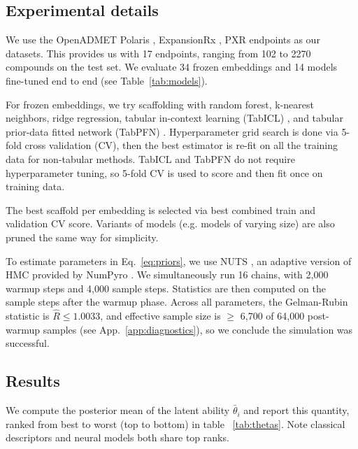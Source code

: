 \documentclass{article}
\begin{document}
\subsection{Experimental details}
We use the OpenADMET Polaris \citep{asap2025, polaris}, ExpansionRx \citep{expansionrx}, PXR \citep{pxr} endpoints as our datasets. This provides us with 17 endpoints, ranging from 102 to 2270 compounds on the test set. We evaluate 34 frozen embeddings and 14 models fine-tuned end to end (see Table~\ref{tab:models}).

For frozen embeddings, we try scaffolding with random forest, k-nearest neighbors, ridge regression, tabular in-context learning (TabICL) \citep{tabicl}, and tabular prior-data fitted network (TabPFN) \citep{tabpfn3}. Hyperparameter grid search is done via 5-fold cross validation (CV), then the best estimator is re-fit on all the training data for non-tabular methods. TabICL and TabPFN do not require hyperparameter tuning, so 5-fold CV is used to score and then fit once on training data.

The best scaffold per embedding is selected via best combined train and validation CV score. Variants of models (e.g. models of varying size) are also pruned the same way for simplicity.

To estimate parameters in Eq.~\ref{eq:priors}, we use NUTS \citep{hoffman2014}, an adaptive version of HMC provided by NumPyro \citep{phan2019, bingham2019}. We simultaneously run 16 chains, with 2,000 warmup steps and 4,000 sample steps. Statistics are then computed on the sample steps after the warmup phase. Across all parameters, the Gelman-Rubin statistic \citep{gelman1992, vehtari2021} is $\hat{R} \leq 1.0033$, and effective sample size is $\geq$ 6,700 of 64,000 post-warmup samples (see App.~\ref{app:diagnostics}), so we conclude the simulation was successful.

\subsection{Results}

We compute the posterior mean of the latent ability $\bar{\theta}_i$ and report this quantity, ranked from best to worst (top to bottom) in table ~\ref{tab:thetas}. Note classical descriptors and neural models both share top ranks.
\end{document}
